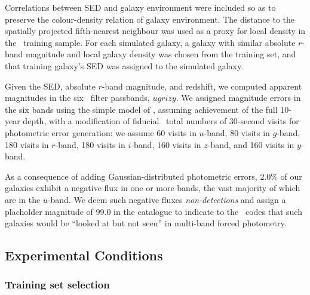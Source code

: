 Correlations between SED and galaxy environment were included so as to preserve the colour-density relation of galaxy environment.
The distance to the spatially projected fifth-nearest neighbour was used as a proxy for local density in the \sdss\ training sample.
For each simulated galaxy, a galaxy with similar absolute $r$-band magnitude and local galaxy density was chosen from the training set, and that training galaxy's SED was assigned to the simulated galaxy.

Given the SED, absolute $r$-band magnitude, and redshift, we computed apparent magnitudes in the six \lsst\ filter passbands, $ugrizy$.
We assigned magnitude errors in the six bands using the simple model of \citet{Ivezic:08}, assuming achievement of the full 10-year depth, with a modification of fiducial \lsst\ total numbers of 30-second visits for photometric error generation: we assume 60 visits in $u$-band, 80 visits in $g$-band, 180 visits in $r$-band, 180 visits in $i$-band, 160 visits in $z$-band, and 160 visits in $y$-band.

As a consequence of adding Gaussian-distributed photometric errors, 2.0\% of our galaxies exhibit a negative flux in one or more bands, the vast majority of which are in the $u$-band.
We deem such negative fluxes \textit{non-detections} and assign a placholder magnitude of 99.0 in the catalogue to indicate to the \pzpdf\ codes that such galaxies would be ``looked at but not seen'' in multi-band forced photometry.

\subsection{Experimental Conditions}
\label{sec:controlled}


\subsubsection{Training set selection}
\label{sec:buzztraining}

